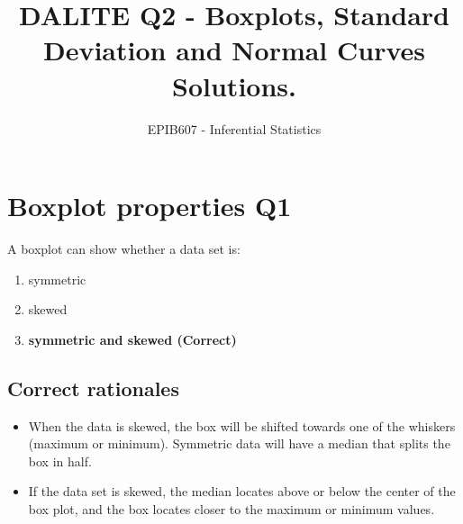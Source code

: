 \documentclass[letterpaper,9pt,twoside,printwatermark=false]{pinp}
\title{DALITE Q2 - Boxplots, Standard Deviation and Normal Curves Solutions.}
\author[a]{EPIB607 - Inferential Statistics}
\affil[a]{Fall 2018, McGill University}
\providecommand{\tightlist}{%
  \setlength{\itemsep}{0pt}\setlength{\parskip}{0pt}}
\begin{document}
\verticaladjustment{-2pt}

\maketitle
\thispagestyle{firststyle}



\hypertarget{boxplot-properties-q1}{%
\section{Boxplot properties Q1}\label{boxplot-properties-q1}}

A boxplot can show whether a data set is:

\begin{enumerate}
\def\labelenumi{\alph{enumi})}
\tightlist
\item
  symmetric
\item
  skewed
\item
  \textbf{symmetric and skewed (Correct)}
\end{enumerate}

\hypertarget{correct-rationales}{%
\subsection{Correct rationales}\label{correct-rationales}}

\begin{itemize}
\tightlist
\item
  When the data is skewed, the box will be shifted towards one of the
  whiskers (maximum or minimum). Symmetric data will have a median that
  splits the box in half.
\item
  If the data set is skewed, the median locates above or below the
  center of the box plot, and the box locates closer to the maximum or
  minimum values.
\end{itemize}
\end{document}
